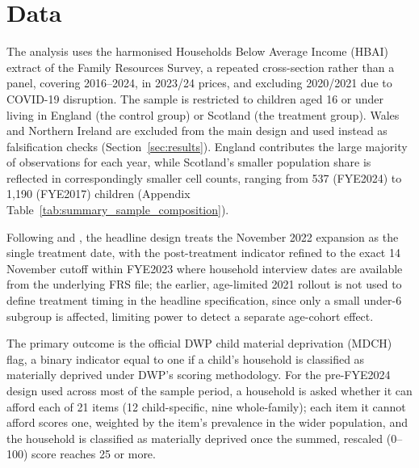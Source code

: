 \section{Data}
\label{sec:data}

The analysis uses the harmonised Households Below Average Income (HBAI) extract of the Family Resources Survey, a repeated cross-section rather than a panel, covering 2016--2024, in 2023/24 prices, and excluding 2020/2021 due to COVID-19 disruption. The sample is restricted to children aged 16 or under living in England (the control group) or Scotland (the treatment group). Wales and Northern Ireland are excluded from the main design and used instead as falsification checks (Section~\ref{sec:results}). England contributes the large majority of observations for each year, while Scotland's smaller population share is reflected in correspondingly smaller cell counts, ranging from 537 (FYE2024) to 1,190 (FYE2017) children (Appendix Table~\ref{tab:summary_sample_composition}).

Following \citet{andersen2025} and \citet{nesom2025}, the headline design treats the November 2022 expansion as the single treatment date, with the post-treatment indicator refined to the exact 14 November cutoff within FYE2023 where household interview dates are available from the underlying FRS file; the earlier, age-limited 2021 rollout is not used to define treatment timing in the headline specification, since only a small under-6 subgroup is affected, limiting power to detect a separate age-cohort effect.

The primary outcome is the official DWP child material deprivation (MDCH) flag, a binary indicator equal to one if a child's household is classified as materially deprived under DWP's scoring methodology. For the pre-FYE2024 design used across most of the sample period, a household is asked whether it can afford each of 21 items (12 child-specific, nine whole-family); each item it cannot afford scores one, weighted by the item's prevalence in the wider population, and the household is classified as materially deprived once the summed, rescaled (0--100) score reaches 25 or more. 

